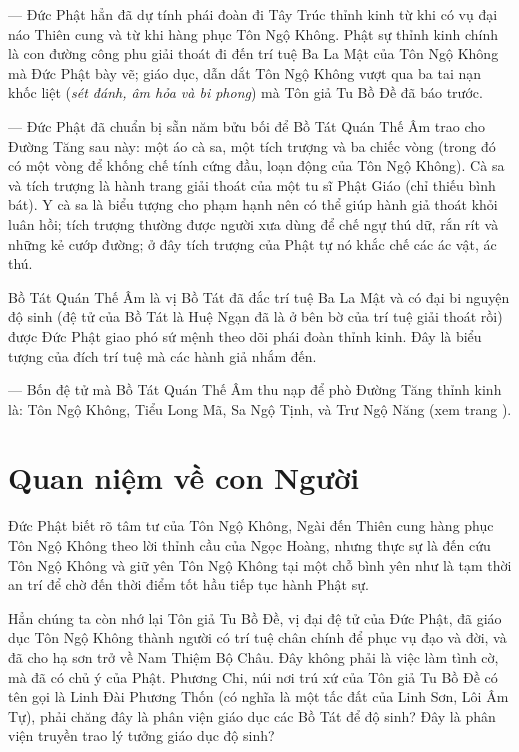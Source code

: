 --- Đức Phật hẳn đã dự tính phái đoàn đi Tây Trúc thỉnh kinh từ khi có vụ đại náo Thiên cung và từ khi hàng phục Tôn Ngộ Không. Phật sự thỉnh kinh chính là con đường công phu giải thoát đi đến trí tuệ Ba La Mật của Tôn Ngộ Không mà Đức Phật bày vẽ; giáo dục, dẫn dắt Tôn Ngộ Không vượt qua ba tai nạn khốc liệt (\emph{sét đánh, âm hỏa và bi phong}) mà Tôn giả Tu Bồ Đề đã báo trước.

--- Đức Phật đã chuẩn bị sẵn năm bửu bối để Bồ Tát Quán Thế Âm trao cho Đường Tăng sau này: một áo cà sa, một tích trượng và ba chiếc vòng (trong đó có một vòng để khống chế tính cứng đầu, loạn động của Tôn Ngộ Không). Cà sa và tích trượng là hành trang giải thoát của một tu sĩ Phật Giáo (chỉ thiếu bình bát). Y cà sa là biểu tượng cho phạm hạnh nên có thể giúp hành giả thoát khỏi luân hồi; tích trượng thường được người xưa dùng để chế ngự thú dữ, rắn rít và những kẻ cướp đường; ở đây tích trượng của Phật tự nó khắc chế các ác vật, ác thú.

Bồ Tát Quán Thế Âm là vị Bồ Tát đã đắc trí tuệ Ba La Mật và có đại bi nguyện độ sinh (đệ tử của Bồ Tát là Huệ Ngạn đã là ở bên bờ của trí tuệ giải thoát rồi) được Đức Phật giao phó sứ mệnh theo dõi phái đoàn thỉnh kinh. Đây là biểu tượng của đích trí tuệ mà các hành giả nhắm đến.

--- Bốn đệ tử mà Bồ Tát Quán Thế Âm thu nạp để phò Đường Tăng thỉnh kinh là: Tôn Ngộ Không, Tiểu Long Mã, Sa Ngộ Tịnh, và Trư Ngộ Năng (xem  trang \pageref{sec:qua_cac_nhan_vat_chinh}).

\section{Quan niệm về con Người} %
\label{sec:8_con_nguoi}

Đức Phật biết rõ tâm tư của Tôn Ngộ Không, Ngài đến Thiên cung hàng phục Tôn Ngộ Không theo lời thỉnh cầu của Ngọc Hoàng, nhưng thực sự là đến cứu Tôn Ngộ Không và giữ yên Tôn Ngộ Không tại một chỗ bình yên như là tạm thời an trí để chờ đến thời điểm tốt hầu tiếp tục hành Phật sự.

Hẳn chúng ta còn nhớ lại Tôn giả Tu Bồ Đề, vị đại đệ tử của Đức Phật, đã giáo dục Tôn Ngộ Không thành người có trí tuệ chân chính để phục vụ đạo và đời, và đã cho hạ sơn trở về Nam Thiệm Bộ Châu. Đây không phải là việc làm tình cờ, mà đã có chủ ý của Phật. Phương Chi, núi nơi trú xứ của Tôn giả Tu Bồ Đề có tên gọi là Linh Đài Phương Thốn (có nghĩa là một tấc đất của Linh Sơn, Lôi Âm Tự), phải chăng đây là phân viện giáo dục các Bồ Tát để độ sinh? Đây là phân viện truyền trao lý tưởng giáo dục độ sinh?

